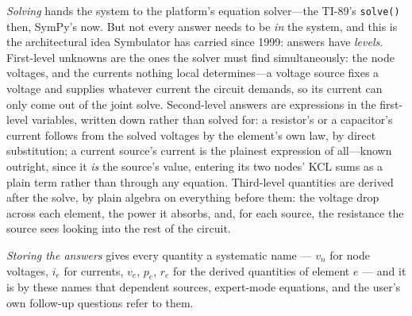 \documentclass[11pt,oneside]{report}
\newcommand{\code}[1]{\texttt{#1}}
\begin{document}
\emph{Solving} hands the system to the platform's equation
solver---the TI-89's \code{solve()} then, SymPy's now. But not every
answer needs to be \emph{in} the system, and this is the architectural
idea Symbulator has carried since 1999: answers have
\emph{levels}. First-level unknowns are the ones the solver must find
simultaneously: the node voltages, and the currents nothing local
determines---a voltage source fixes a voltage and supplies whatever
current the circuit demands, so its current can only come out of the
joint solve. Second-level answers are expressions in the first-level
variables, written down rather than solved for: a resistor's or a
capacitor's current follows from the solved voltages by the element's
own law, by direct substitution; a current source's current is the
plainest expression of all---known outright, since it \emph{is} the
source's value, entering its two nodes' KCL sums as a plain term
rather than through any equation. Third-level quantities are derived
after the solve, by plain algebra on everything before them: the
voltage drop across each element, the power it absorbs, and, for
each source, the resistance the source sees looking into the rest of
the circuit.

\emph{Storing the answers} gives every quantity a systematic name ---
$v_n$ for node voltages, $i_e$ for currents, $v_e$, $p_e$, $r_e$ for
the derived quantities of element $e$ --- and it is by these names
that dependent sources, expert-mode equations, and the user's own
follow-up questions refer to them.
\end{document}
